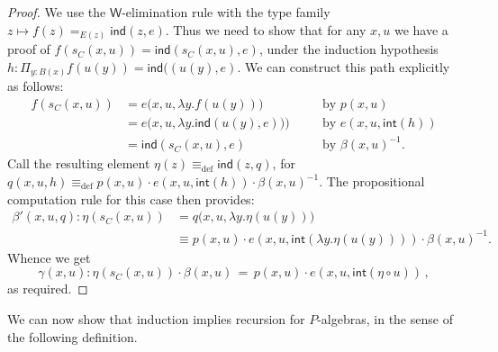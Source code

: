 \documentclass[reqno,10pt,a4paper,oneside]{amsart}
\numberwithin{equation}{section}
\theoremstyle{mythm}
\theoremstyle{mydef}
\theoremstyle{myrmk}
\newcommand{\by}[1]{\quad&&\text{by {$#1$}}}
\newcommand{\deq}{\equiv}
\newcommand{\peq}{=}
\newcommand{\defeq}{\deq_{\mathrm{def}}}
\renewcommand{\int}{\mathsf{int}}
\newcommand{\prd}[1]{\Pi_{#1}}
\newcommand{\W}{\mathsf{W}}
\newcommand{\ind}{\mathsf{ind}}
\begin{document}
\begin{proof}
We use the $\W$-elimination rule with the type family $z \mapsto f(z) =_{E(z)} \ind(z,e)$. Thus we need to show that for any $x,u$ we have a proof of $f(s_C(x,u)) = \ind(s_C(x,u),e)$, under the induction hypothesis $h : \prd{y:B(x)} f(u(y)) = \ind((u(y),e)$. We can construct this path explicitly as follows:
\begin{align*}
f(s_C(x,u)) &= e\big(x,u,\lambda y.f(u(y))\big) \by{p(x,u)}\\
	&= e\big(x,u,\lambda y.\ind(u(y),e))\big) \by{e(x,u,\int(h))}\\
	&= \ind(s_C(x,u),e) \by{\beta(x,u)^{-1}}.
\end{align*}
Call the resulting element $\eta(z) \defeq \ind(z,q)$, for $q(x,u,h) \defeq p(x,u)\cdot e(x,u,\int(h))\cdot\beta(x,u)^{-1}$.
The propositional computation rule for this case then provides:
\begin{align*}
\beta'(x,u,q) :  \eta(s_C(x,u)) &\peq q\big(x,u,\lambda{y}.\eta(u(y))\big)\\
	&\deq p(x,u)\cdot e(x,u,\int(\lambda y.\eta(u(y))))\cdot\beta(x,u)^{-1}.
\end{align*}
Whence we get
\[
\gamma (x,u) :  \eta(s_C(x,u)) \cdot \beta(x,u)\,\peq\,
 	p(x,u)\cdot e(x,u,\int(\eta\circ u))\, ,
	\]
as required.
\end{proof}

We can now show that induction implies recursion for $P$-algebras, in the sense of the following definition.
\end{document}

